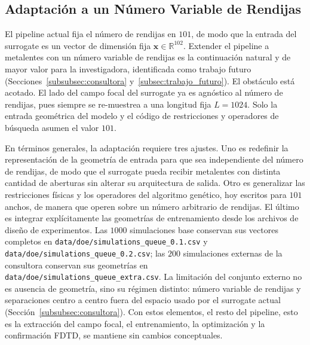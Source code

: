 \subsection{Adaptación a un Número Variable de Rendijas}\label{subsec:anexo_variable}

El pipeline actual fija el número de rendijas en $101$, de modo que la entrada del surrogate es un vector de dimensión fija $\mathbf{x}\in\mathbb{R}^{102}$. Extender el pipeline a metalentes con un número variable de rendijas es la continuación natural y de mayor valor para la investigadora, identificada como trabajo futuro (Secciones~\ref{subsubsec:consultora} y~\ref{subsec:trabajo_futuro}). El obstáculo está acotado. El lado del campo focal del surrogate ya es agnóstico al número de rendijas, pues siempre se re-muestrea a una longitud fija $L=1024$. Solo la entrada geométrica del modelo y el código de restricciones y operadores de búsqueda asumen el valor $101$.

En términos generales, la adaptación requiere tres ajustes. Uno es redefinir la representación de la geometría de entrada para que sea independiente del número de rendijas, de modo que el surrogate pueda recibir metalentes con distinta cantidad de aberturas sin alterar su arquitectura de salida. Otro es generalizar las restricciones físicas y los operadores del algoritmo genético, hoy escritos para $101$ anchos, de manera que operen sobre un número arbitrario de rendijas. El último es integrar explícitamente las geometrías de entrenamiento desde los archivos de diseño de experimentos. Las $1000$ simulaciones base conservan sus vectores completos en \texttt{data/doe/simulations\_queue\_0.1.csv} y \texttt{data/doe/simulations\_queue\_0.2.csv}; las $200$ simulaciones externas de la consultora conservan sus geometrías en \texttt{data/doe/simulations\_queue\_extra.csv}. La limitación del conjunto externo no es ausencia de geometría, sino su régimen distinto: número variable de rendijas y separaciones centro a centro fuera del espacio usado por el surrogate actual (Sección~\ref{subsubsec:consultora}). Con estos elementos, el resto del pipeline, esto es la extracción del campo focal, el entrenamiento, la optimización y la confirmación FDTD, se mantiene sin cambios conceptuales.
